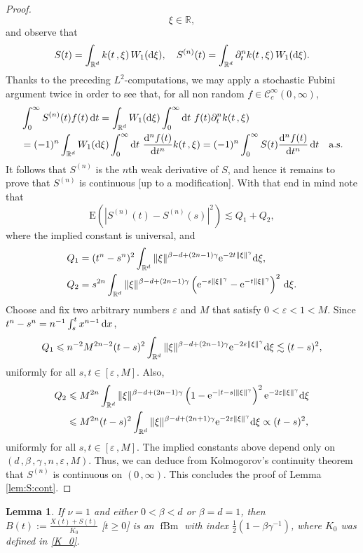 \documentclass[reqno]{amsart}
\DeclareMathOperator{\fBm}{fBm}
\newcommand{\<}{\langle}
\renewcommand{\>}{\rangle}
\newcommand{\R}{\mathbb{R}}
\newcommand{\cC}{\mathcal{C}}
\newcommand{\E}{\mathrm{E}}
\newcommand{\1}{\mathbb{1}}
\renewcommand{\d}{{\rm d}}
\newcommand{\e}{{\rm e}}
\renewcommand{\ge}{\geqslant}
\renewcommand{\le}{\leqslant}
\newtheorem{lemma}[stat]{Lemma}
\theoremstyle{definition}
\numberwithin{equation}{section}
\begin{document}
\begin{proof}
\[		\xi\in\R,
	\]
	and observe that 
	\[
		S(t)=\int_{\R^d} k(t\,,\xi)\,W_1(\d\xi),\quad
		S^{(n)}(t) = \int_{\R^d} \partial^n_t k(t\,,\xi)\, W_1(\d\xi).
	\]
	Thanks to the preceding $L^2$-computations, we may apply a stochastic Fubini
	argument twice in order to see that, for all non random $f\in\cC^\infty_c(0\,,\infty)$,
	\begin{align*}
		&\int_0^\infty S^{(n)}(t)f(t)\,\d t = \int_{\R^d} W_1(\d\xi)
			\int_0^\infty\d t\ f(t)\partial^n_t k(t\,,\xi)\\
		&= (-1)^n\int_{\R^d} W_1(\d\xi)
			\int_0^\infty\d t\ \frac{\d^n f(t)}{\d t^n} k(t\,,\xi)
			= (-1)^n\int_0^\infty S(t)\frac{\d^n f(t)}{\d t^n}\,\d t
			\quad\text{a.s.}
	\end{align*}
	It follows that $S^{(n)}$ is the $n$th weak derivative of $S$, and hence it remains to 
	prove that $S^{(n)}$ is continuous [up to a modification]. With that end in mind note that
	\[
		\E\left(|S^{(n)}(t) - S^{(n)}(s)|^2\right)\lesssim Q_1+Q_2,
	\]
	where the implied constant is universal, and
	\begin{align*}
		Q_1&= (t^n-s^n)^2 \int_{\R^d} \|\xi\|^{\beta-d+(2n-1)\gamma} \e^{-2t\|\xi\|^\gamma}\d\xi,\\
		Q_2&= s^{2n}\int_{\R^d} \|\xi\|^{\beta-d+(2n-1)\gamma}
			\left( \e^{-s\|\xi\|^\gamma} - \e^{-t\|\xi\|^\gamma}\right)^2\,\d\xi.
	\end{align*}
	Choose and fix two arbitrary numbers $\varepsilon$ and $M$ that satisfy
	$0<\varepsilon<1<M$. Since
	$t^n-s^n=n^{-1}\int_s^t x^{n-1}\,\d x$,
	\[
		Q_1 \le n^{-2}M^{2n-2}(t-s)^2\int_{\R^d} 
		\|\xi\|^{\beta-d+(2n-1)\gamma} \e^{-2\varepsilon\|\xi\|^\gamma}\d\xi
		\lesssim (t-s)^2,
	\]
	uniformly for all $s,t\in[\varepsilon\,,M]$. Also,
	\begin{align*}
		Q_2&\le M^{2n}\int_{\R^d} \|\xi\|^{\beta-d+(2n-1)\gamma}
			\left( 1-\e^{-|t-s| \|\xi\|^\gamma}\right)^2 
			\e^{-2\varepsilon\|\xi\|^\gamma}\d\xi\\
		&\le M^{2n}(t-s)^2\int_{\R^d} \|\xi\|^{\beta-d+(2n+1)\gamma}
			 \e^{-2\varepsilon\|\xi\|^\gamma}\d\xi \propto (t-s)^2,
	\end{align*}	
	uniformly for all $s,t\in[\varepsilon\,,M]$.
	The implied constants above depend only on 
	$(d\,,\beta\,,\gamma\,,n\,,\varepsilon\,,M)$.
	Thus, we can deduce from Kolmogorov's continuity theorem 
	that $S^{(n)}$ is continuous on $(0\,,\infty)$. 
	 This concludes the proof of Lemma \ref{lem:S:cont}.
\end{proof}

\begin{lemma}\label{lem:X:fBm}
	If $\nu = 1$ and either $0<\beta<d$ or $\beta=d=1$, then
	$B(t):= \frac{X(t)+S(t)}{K_0}$ [$t\ge 0$]
	is an $\fBm$  with index $\frac12(1-\beta\gamma^{-1})$, 
	where $K_0$ was defined in \eqref{K_0}.
\end{lemma}
\end{document}
